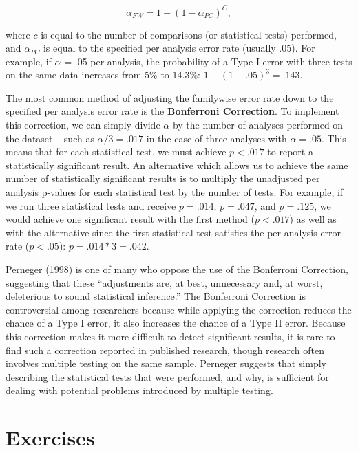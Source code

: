 \documentclass[]{book}
\begin{document}
\[ \alpha_{FW} = 1 - (1 - \alpha_{PC})^C,  \]

where \(c\) is equal to the number of comparisons (or statistical tests) performed, and \(\alpha_{PC}\) is equal to the specified per analysis error rate (usually .05). For example, if \(\alpha\) = .05 per analysis, the probability of a Type I error with three tests on the same data increases from 5\% to 14.3\%: \(1 - (1 - .05)^3 = .143\).

The most common method of adjusting the familywise error rate down to the specified per analysis error rate is the \textbf{Bonferroni Correction}. To implement this correction, we can simply divide \(\alpha\) by the number of analyses performed on the dataset -- such as \(\alpha / 3 = .017\) in the case of three analyses with \(\alpha = .05\). This means that for each statistical test, we must achieve \(p < .017\) to report a statistically significant result. An alternative which allows us to achieve the same number of statistically significant results is to multiply the unadjusted per analysis p-values for each statistical test by the number of tests. For example, if we run three statistical tests and receive \(p = .014\), \(p = .047\), and \(p = .125\), we would achieve one significant result with the first method (\(p < .017\)) as well as with the alternative since the first statistical test satisfies the per analysis error rate (\(p < .05\)): \(p = .014 * 3 = .042\).

Perneger (1998) is one of many who oppose the use of the Bonferroni Correction, suggesting that these ``adjustments are, at best, unnecessary and, at worst, deleterious to sound statistical inference.'' The Bonferroni Correction is controversial among researchers because while applying the correction reduces the chance of a Type I error, it also increases the chance of a Type II error. Because this correction makes it more difficult to detect significant results, it is rare to find such a correction reported in published research, though research often involves multiple testing on the same sample. Perneger suggests that simply describing the statistical tests that were performed, and why, is sufficient for dealing with potential problems introduced by multiple testing.

\hypertarget{exercises-4}{%
\section{Exercises}\label{exercises-4}}
\end{document}
